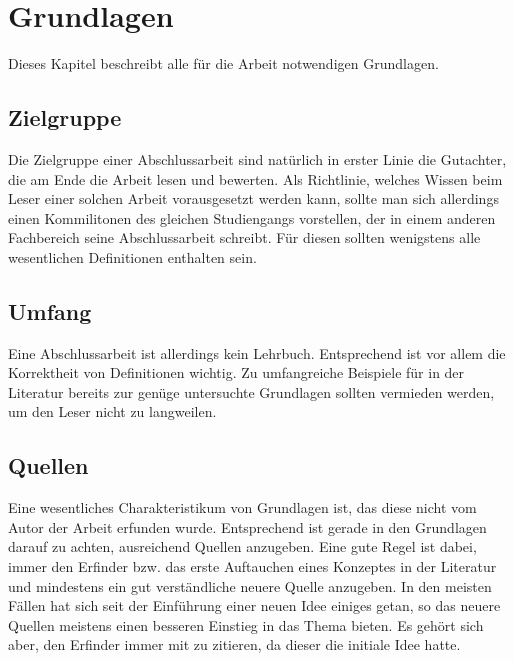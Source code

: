 
\chapter{Grundlagen}
\label{chapter-basics}

Dieses Kapitel beschreibt alle für die Arbeit notwendigen Grundlagen.

\section{Zielgruppe}

Die Zielgruppe einer Abschlussarbeit sind natürlich in erster Linie die Gutachter, die am Ende die Arbeit lesen und bewerten. Als Richtlinie, welches Wissen beim Leser einer solchen Arbeit vorausgesetzt werden kann, sollte man sich allerdings einen Kommilitonen des gleichen Studiengangs vorstellen, der in einem anderen Fachbereich seine Abschlussarbeit schreibt. Für diesen sollten wenigstens alle wesentlichen Definitionen enthalten sein.

\section{Umfang}

Eine Abschlussarbeit ist allerdings kein Lehrbuch. Entsprechend ist vor allem die Korrektheit von Definitionen wichtig. Zu umfangreiche Beispiele für in der Literatur bereits zur genüge untersuchte Grundlagen sollten vermieden werden, um den Leser nicht zu langweilen.

\section{Quellen}

Eine wesentliches Charakteristikum von Grundlagen ist, das diese nicht vom Autor der Arbeit erfunden wurde. Entsprechend ist gerade in den Grundlagen darauf zu achten, ausreichend Quellen anzugeben. Eine gute Regel ist dabei, immer den Erfinder bzw. das erste Auftauchen eines Konzeptes in der Literatur und mindestens ein gut verständliche neuere Quelle anzugeben. In den meisten Fällen hat sich seit der Einführung einer neuen Idee einiges getan, so das neuere Quellen meistens einen besseren Einstieg in das Thema bieten. Es gehört sich aber, den Erfinder immer mit zu zitieren, da dieser die initiale Idee hatte.

